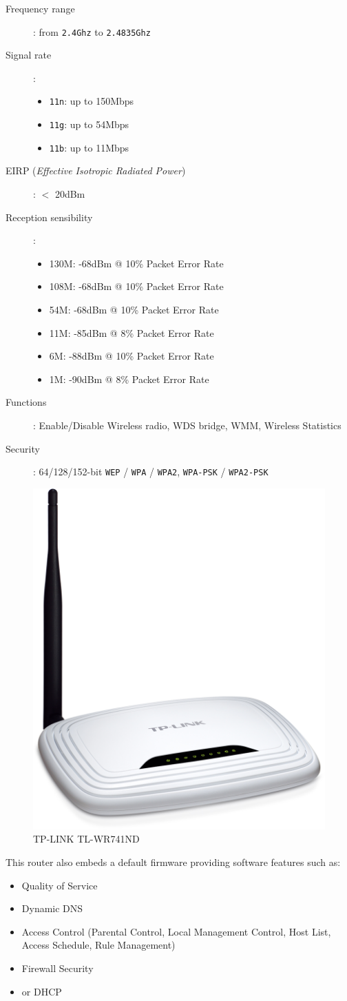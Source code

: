 \begin{description}
	\item [Frequency range]: from \texttt{2.4Ghz} to \texttt{2.4835Ghz}
	\item [Signal rate]:
		\begin{itemize}
			\item \texttt{11n}: up to 150Mbps
			\item \texttt{11g}: up to 54Mbps
			\item \texttt{11b}: up to 11Mbps
		\end{itemize}
	\item [EIRP (\textit{Effective Isotropic Radiated Power})]: $<$ 20dBm 
	\item [Reception sensibility]:
		\begin{itemize}
			\item 130M: -68dBm @ 10\% Packet Error Rate
			\item 108M: -68dBm @ 10\% Packet Error Rate
			\item 54M: -68dBm @ 10\% Packet Error Rate
			\item 11M: -85dBm @ 8\% Packet Error Rate
			\item 6M: -88dBm @ 10\% Packet Error Rate
			\item 1M: -90dBm @ 8\% Packet Error Rate
		\end{itemize}
	\item [Functions]: Enable/Disable Wireless radio, WDS bridge, WMM, Wireless Statistics
	\item [Security]: 64/128/152-bit \texttt{WEP} / \texttt{WPA} / \texttt{WPA2}, \texttt{WPA-PSK} / \texttt{WPA2-PSK}
\end{description}
\begin{figure}[H]
	\begin{center}
		\includegraphics[width=0.26\linewidth]{Pictures/Chapter5/router.jpg}
		\caption{TP-LINK TL-WR741ND}
	\end{center}
\end{figure}
This router also embeds a default firmware providing software features such as:
\begin{itemize}
	\item Quality of Service
	\item Dynamic DNS
	\item Access Control (Parental Control, Local Management Control, Host List, Access Schedule, Rule Management)
	\item Firewall Security
	\item or DHCP
\end{itemize}

